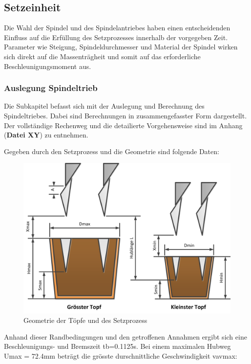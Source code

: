 \subsection{Setzeinheit}
Die Wahl der Spindel und des Spindelantriebes haben einen entscheidenden Einfluss auf die Erfüllung des Setzprozesses innerhalb der vorgegeben Zeit. Parameter wie Steigung, Spindeldurchmesser und Material der Spindel wirken sich direkt auf die Massenträgheit und somit auf das erforderliche Beschleunigungsmoment aus.

\subsubsection{Auslegung Spindeltrieb}
Die Subkapitel befasst sich mit der Auslegung und Berechnung des Spindeltriebes. Dabei sind Berechnungen in zusammengefasster Form dargestellt. Der vollständige Rechenweg und die detailierte Vorgehensweise sind im Anhang (\textbf{Datei XY}) zu entnehmen.

Gegeben durch den Setzprozess und die Geometrie sind folgende Daten:
	\begin{figure}[H]
	\includegraphics[width=1\textwidth]{Illustrationen/6-Umsetzung/topfgeometrie.png}
	\caption{Geometrie der Töpfe und des Setzprozess}
	\label{fig:topfgeometrie}
	\end{figure}
Anhand dieser Randbedingungen und den getroffenen Annahmen ergibt sich eine Beschleunigungs- und Bremszeit tb=0.1125s. Bei einem maximalen Hubweg Umax = 72.4mm beträgt die grösste durschnittliche Geschwindigkeit vavmax:

